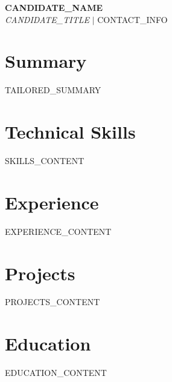 \documentclass[letterpaper,9.5pt]{article}
\newcommand{\resumeSubHeadingListStart}{\begin{itemize}[leftmargin=0.12in, label={}]}
\newcommand{\resumeSubHeadingListEnd}{\end{itemize}}
\begin{document}
\begin{center}
    \textbf{\Large \scshape {{ CANDIDATE_NAME }}} \\ \vspace{1pt}
    \footnotesize \textit{{{ CANDIDATE_TITLE }}} $|$ {{ CONTACT_INFO }}
\end{center}

\section{Summary}
\footnotesize{
    {{ TAILORED_SUMMARY }}
}

\section{Technical Skills}
\begin{itemize}[leftmargin=0.12in, label={}]
    \footnotesize{\item{
        {{ SKILLS_CONTENT }}
    }}
\end{itemize}

\section{Experience}
\resumeSubHeadingListStart

{{ EXPERIENCE_CONTENT }}

\resumeSubHeadingListEnd

\section{Projects}
\resumeSubHeadingListStart

{{ PROJECTS_CONTENT }}

\resumeSubHeadingListEnd

\section{Education}
\resumeSubHeadingListStart

{{ EDUCATION_CONTENT }}

\resumeSubHeadingListEnd
\end{document}
